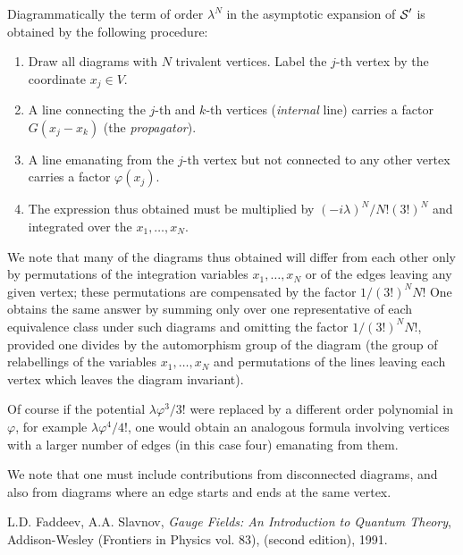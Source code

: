 Diagrammatically the term of order $\lambda^N$ in the 
asymptotic expansion of ${\mbox{$\cal S$}}'$ is  obtained by the 
following procedure:

\begin{enumerate}
\item Draw all diagrams with $N$ trivalent vertices. Label the $j$-th 
vertex by the coordinate $x_j \in V$. 
\item A line connecting the $j$-th and $k$-th vertices ({\em internal} line)
carries a factor $G(x_j - x_k)$ (the {\em propagator}).
\item A line emanating from the $j$-th vertex but not connected to any
other vertex carries a factor $\varphi(x_j)$. 
\item The expression thus obtained must be 
multiplied by $(-i \lambda)^N/N!(3!)^N $ and integrated over 
the $x_1, \dots, x_N$. 
\end{enumerate}

We note that many of the diagrams thus obtained will differ from each other
only by permutations of the integration variables 
$x_1, \dots, x_N$ or of the edges leaving any given 
vertex; these permutations are compensated by the 
factor $1/(3!)^N N!$ One obtains the same answer by summing only over
one representative of each equivalence class under such diagrams and 
omitting the factor $1/(3!)^N N!$, provided one divides
by the automorphism group of the diagram (the group of relabellings
of the variables $x_1, \dots, x_N$ and permutations
of the lines leaving each vertex which leaves the diagram invariant). 

Of course if the potential $\lambda \varphi^3/3!$ were replaced by 
a different order polynomial in $\varphi$, for example 
$\lambda \varphi^4/4!$, one
would obtain an analogous formula involving vertices with 
a larger number of edges (in this case four)  emanating from them.

We note that one must include contributions from disconnected diagrams, 
and also from diagrams where an edge starts and ends at the same vertex.




















\begin{thebibliography}{99}
 L.D. Faddeev, A.A.  Slavnov, {\em Gauge Fields: An Introduction 
to Quantum Theory}, Addison-Wesley (Frontiers in Physics vol. 83), (second 
edition), 1991. 
\end{thebibliography}





